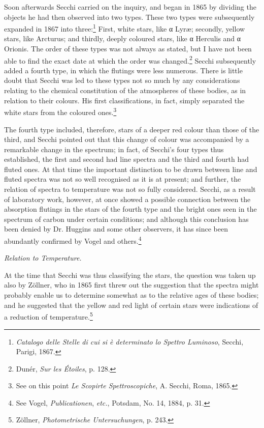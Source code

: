 \documentclass[a4paper, 12pt, oneside, polutonikogreek, english]{article}
\begin{document}
Soon afterwards Secchi carried on the inquiry, and began in 1865 by dividing the objects he had then observed into two types. These two types were subsequently expanded in 1867 into three:\footnote{\emph{Catalogo delle Stelle di cui si è determinato lo Spettro Luminoso}, Secchi, Parigi, 1867.} First, white stars, like α Lyræ; secondly, yellow stars, like Arcturus; and thirdly, deeply coloured stars, like α Herculis and α Orionis. The order of these types was not always as stated, but I have not been able to find the exact date at which the order was changed.\footnote{Dunér, \emph{Sur les Étoiles}, p. 128.} Secchi subsequently added a fourth type, in which the flutings were less numerous. There is little doubt that Secchi was led to these types not so much by any considerations relating to the chemical constitution of the atmospheres of these bodies, as in relation to their colours. His first classifications, in fact, simply separated the white stars from the coloured ones.\footnote{See on this point \emph{Le Scopirte Spettroscopiche}, A. Secchi, Roma, 1865.}

The fourth type included, therefore, stars of a deeper red colour than those of the third, and Secchi pointed out that this change of colour was accompanied by a remarkable change in the spectrum; in fact, of Secchi's four types thus established, the first and second had line spectra and the third and fourth had fluted ones. At that time the important distinction to be drawn between line and fluted spectra was not so well recognised as it is at present; and further, the relation of spectra to temperature was not so fully considered. Secchi, as a result of laboratory work, however, at once showed a possible connection between the absorption flutings in the stars of the fourth type and the bright ones seen in the spectrum of carbon under certain conditions; and although this conclusion has been denied by Dr. Huggins and some other observers, it has since been abundantly confirmed by Vogel and others.\footnote{See Vogel, \emph{Publicationen}, \emph{etc.}, Potsdam, No. 14, 1884, p. 31.}

\emph{Relation to Temperature.}

At the time that Secchi was thus classifying the stars, the question was taken up also by Zöllner, who in 1865 first threw out the suggestion that the spectra might probably enable us to determine somewhat as to the relative ages of these bodies; and he suggested that the yellow and red light of certain stars were indications of a reduction of temperature.\footnote{Zöllner, \emph{Photometrische Untersuchungen}, p. 243.}
\end{document}
